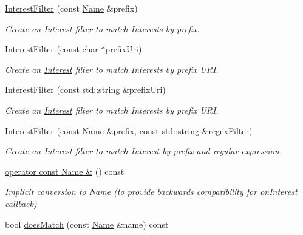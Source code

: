 \begin{DoxyCompactItemize}
\item 
\hyperlink{classndn_1_1InterestFilter_a990d4f218e4d31b0e71b9cbbfc4e3607}{Interest\+Filter} (const \hyperlink{classndn_1_1Name}{Name} \&prefix)
\begin{DoxyCompactList}\small\item\em Create an \hyperlink{classndn_1_1Interest}{Interest} filter to match Interests by prefix. \end{DoxyCompactList}\item 
\hyperlink{classndn_1_1InterestFilter_acff9e3d47239fa47e7f3c08d3ebef10d}{Interest\+Filter} (const char $\ast$prefix\+Uri)
\begin{DoxyCompactList}\small\item\em Create an \hyperlink{classndn_1_1Interest}{Interest} filter to match Interests by prefix U\+RI. \end{DoxyCompactList}\item 
\hyperlink{classndn_1_1InterestFilter_af7c2910a549c8114f4f8209ea461207d}{Interest\+Filter} (const std\+::string \&prefix\+Uri)
\begin{DoxyCompactList}\small\item\em Create an \hyperlink{classndn_1_1Interest}{Interest} filter to match Interests by prefix U\+RI. \end{DoxyCompactList}\item 
\hyperlink{classndn_1_1InterestFilter_a224ef757b4504f532c8a9cdddfc9dd17}{Interest\+Filter} (const \hyperlink{classndn_1_1Name}{Name} \&prefix, const std\+::string \&regex\+Filter)
\begin{DoxyCompactList}\small\item\em Create an \hyperlink{classndn_1_1Interest}{Interest} filter to match \hyperlink{classndn_1_1Interest}{Interest} by prefix and regular expression. \end{DoxyCompactList}\item 
\hyperlink{classndn_1_1InterestFilter_ac344d3ba1d6e23ba538674e3caf7f7f6}{operator const Name \&} () const\hypertarget{classndn_1_1InterestFilter_ac344d3ba1d6e23ba538674e3caf7f7f6}{}\label{classndn_1_1InterestFilter_ac344d3ba1d6e23ba538674e3caf7f7f6}

\begin{DoxyCompactList}\small\item\em Implicit conversion to \hyperlink{classndn_1_1Name}{Name} (to provide backwards compatibility for on\+Interest callback) \end{DoxyCompactList}\item 
bool \hyperlink{classndn_1_1InterestFilter_aa601b905ce225b012bff1e7dc2c1f321}{does\+Match} (const \hyperlink{classndn_1_1Name}{Name} \&name) const\hypertarget{classndn_1_1InterestFilter_aa601b905ce225b012bff1e7dc2c1f321}{}\label{classndn_1_1InterestFilter_aa601b905ce225b012bff1e7dc2c1f321}


\end{DoxyCompactItemize}
